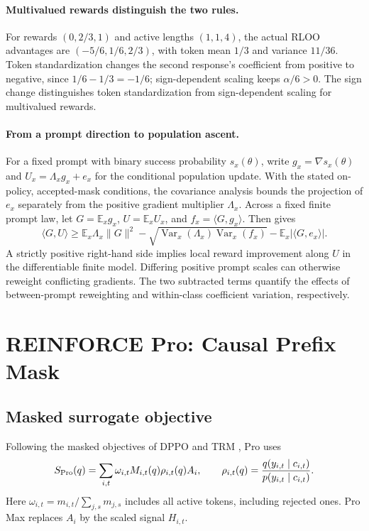 \paragraph{Multivalued rewards distinguish the two rules.}
\label{par:multivalued-sign-example}
For rewards $(0,2/3,1)$ and active lengths $(1,1,4)$, the actual RLOO
advantages are $(-5/6,1/6,2/3)$, with token mean $1/3$ and variance
$11/36$. Token standardization changes the second response's coefficient
from positive to negative, since $1/6-1/3=-1/6$; sign-dependent scaling
keeps $\alpha/6>0$. The sign change distinguishes token standardization from sign-dependent
scaling for multivalued rewards.

\paragraph{From a prompt direction to population ascent.}
For a fixed prompt with binary success probability $s_x(\theta)$, write
$g_x=\nabla s_x(\theta)$ and $U_x=\Lambda_xg_x+e_x$ for the conditional
population update. With the stated on-policy, accepted-mask
conditions, the covariance analysis bounds the projection of $e_x$
separately from the positive gradient multiplier $\Lambda_x$. Across a fixed finite prompt law,
let $G=\mathbb E_xg_x$, $U=\mathbb E_xU_x$, and
$f_x=\langle G,g_x\rangle$. Then  gives
\[
 \langle G,U\rangle\ge
 \mathbb E_x\Lambda_x\|G\|^2-
 \sqrt{\operatorname{Var}_x(\Lambda_x)\operatorname{Var}_x(f_x)}
 -\mathbb E_x|\langle G,e_x\rangle|.
\]
A strictly positive right-hand side implies local reward improvement along
$U$ in the differentiable finite model. Differing positive prompt scales
can otherwise reweight conflicting gradients. The two subtracted terms
quantify the effects of between-prompt reweighting and within-class
coefficient variation, respectively.

\section{REINFORCE Pro: Causal Prefix Mask}
\subsection{Masked surrogate objective}
Following the masked objectives of DPPO and TRM
\citep{qi2026rethinkingtrustregionllm,li2025trm}, Pro uses
\[
 S_{\rm Pro}(q)=\sum_{i,t}\omega_{i,t}M_{i,t}(q)\rho_{i,t}(q)A_i,
 \qquad \rho_{i,t}(q)=\frac{q(y_{i,t}\mid c_{i,t})}{p(y_{i,t}\mid c_{i,t})}.
\]
Here $\omega_{i,t}=m_{i,t}/\sum_{j,s}m_{j,s}$ includes all active tokens,
including rejected ones. Pro Max replaces $A_i$ by the scaled signal $H_{i,t}$.

